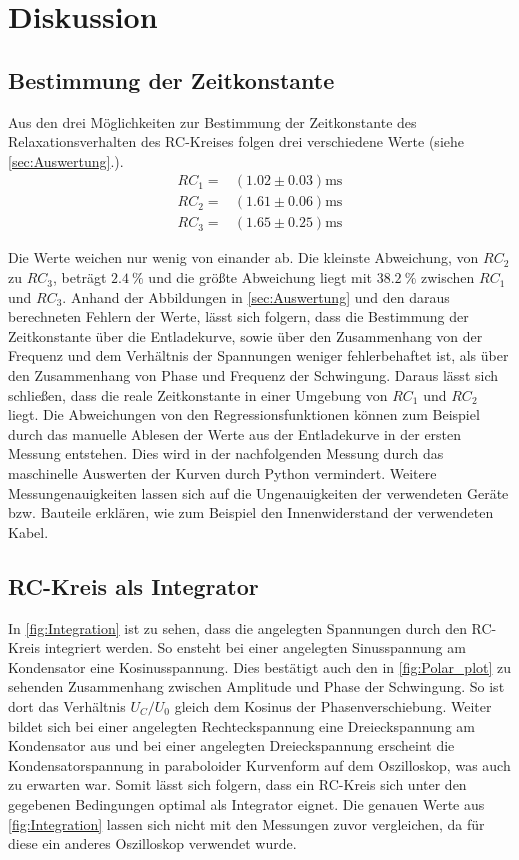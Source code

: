 \section{Diskussion}
\label{sec:Diskussion}
\subsection{Bestimmung der Zeitkonstante} %
\label{sub:Bestimmung der Zeitkonstante}
Aus den drei Möglichkeiten zur Bestimmung der Zeitkonstante des Relaxationsverhalten des RC-Kreises folgen drei verschiedene Werte (siehe \autoref{sec:Auswertung}.).
\begin{align*}
    RC_1=&(1.02 ± 0.03)\si{\milli\second}\\
    RC_2=&(1.61 ± 0.06)\si{\milli\second}\\
    RC_3=&(1.65 ± 0.25)\si{\milli\second}
\end{align*}

Die Werte weichen nur wenig von einander ab. Die kleinste Abweichung, von $RC_2$ zu $RC_3$, beträgt $\qty{2.4}{\percent}$ und die größte Abweichung
liegt mit $\qty{38.2}{\percent}$ zwischen $RC_1$ und $RC_3$.
Anhand der Abbildungen in \autoref{sec:Auswertung} und den daraus berechneten Fehlern der Werte, lässt sich folgern, dass die Bestimmung der Zeitkonstante über die Entladekurve,
sowie über den Zusammenhang von der Frequenz und dem Verhältnis der Spannungen weniger fehlerbehaftet ist, als über den Zusammenhang von Phase und Frequenz der Schwingung.
Daraus lässt sich schließen, dass die reale Zeitkonstante in einer Umgebung von $RC_1$ und $RC_2$ liegt.
Die Abweichungen von den Regressionsfunktionen können zum Beispiel durch das manuelle Ablesen der Werte aus der Entladekurve in der ersten Messung entstehen.
Dies wird in der nachfolgenden Messung durch das maschinelle Auswerten der Kurven durch Python vermindert. 
Weitere Messungenauigkeiten lassen sich auf die Ungenauigkeiten der verwendeten Geräte bzw. Bauteile erklären, wie zum Beispiel den Innenwiderstand der
verwendeten Kabel.

\subsection{RC-Kreis als Integrator} %
\label{sub:RC-Kreis als Integrator}
In \autoref{fig:Integration} ist zu sehen, dass die angelegten Spannungen durch den RC-Kreis integriert werden.
So ensteht bei einer angelegten Sinusspannung am Kondensator eine Kosinusspannung. Dies bestätigt auch den in \autoref{fig:Polar_plot} zu sehenden
Zusammenhang zwischen Amplitude und Phase der Schwingung. So ist dort das Verhältnis $U_C/U_0$ gleich dem Kosinus der Phasenverschiebung.
Weiter bildet sich bei einer angelegten Rechteckspannung eine Dreieckspannung am Kondensator aus und bei einer angelegten Dreieckspannung
erscheint die Kondensatorspannung in paraboloider Kurvenform auf dem Oszilloskop, was auch zu erwarten war.
Somit lässt sich folgern, dass ein RC-Kreis sich unter den gegebenen Bedingungen optimal als Integrator eignet.
Die genauen Werte aus \autoref{fig:Integration} lassen sich nicht mit den Messungen zuvor vergleichen, da für diese ein anderes Oszilloskop verwendet wurde.

